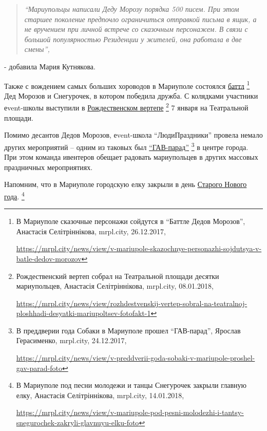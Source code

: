 \begin{quote}
\em\enquote{Мариупольцы написали Деду Морозу порядка 500 писем. При этом старшее поколение
предпочло ограничиться отправкой письма в ящик, а не вручением при личной
встрече со сказочным персонажем. В связи с большой популярностью Резиденции у
жителей, она работала в две смены}, 
\end{quote}
- добавила Мария Кутнякова.


Также с вождением самых больших хороводов в Мариуполе состоялся \href{https://mrpl.city/news/view/v-mariupole-skazochnye-personazhi-sojdutsya-v-batle-dedov-morozov}{баттл}%
\footnote{В Мариуполе сказочные персонажи сойдутся в \enquote{Баттле Дедов Морозов}, Анастасія Селітріннікова, mrpl.city, 26.12.2017, \par%
\url{https://mrpl.city/news/view/v-mariupole-skazochnye-personazhi-sojdutsya-v-batle-dedov-morozov}}
Дед Морозов и Снегурочек, в котором победила дружба. С колядками участники
еvent-школы выступили в \href{https://mrpl.city/news/view/rozhdestvenskij-vertep-sobral-na-teatralnoj-ploshhadi-desyatki-mariupoltsev-fotofakt-1}{Рождественском вертепе}%
\footnote{Рождественский вертеп собрал на Театральной площади десятки мариупольцев, Анастасія Селітріннікова, mrpl.city, 08.01.2018, \par%
\url{https://mrpl.city/news/view/rozhdestvenskij-vertep-sobral-na-teatralnoj-ploshhadi-desyatki-mariupoltsev-fotofakt-1}
}
7 января на Театральной площади.

Помимо десантов Дедов Морозов, еvent-школа \enquote{ЛюдиПраздники} провела немало
других мероприятий – одним из таковых был \href{https://mrpl.city/news/view/v-preddverii-goda-sobaki-v-mariupole-proshel-gav-parad-foto}{\enquote{ГАВ-парад}}%
\footnote{В преддверии года Собаки в Мариуполе прошел \enquote{ГАВ-парад}, Ярослав Герасименко, mrpl.city, 24.12.2017, \par%
\url{https://mrpl.city/news/view/v-preddverii-goda-sobaki-v-mariupole-proshel-gav-parad-foto}
}
в центре города. При этом команда ивентеров обещает радовать мариупольцев в
других массовых праздничных мероприятиях.

Напомним, что в Мариуполе городскую елку закрыли в день \href{https://mrpl.city/news/view/v-mariupole-pod-pesni-molodezhi-i-tantsy-snegurochek-zakryli-glavnuyu-elku-foto}{Старого Нового года}.%
\footnote{В Мариуполе под песни молодежи и танцы Снегурочек закрыли главную елку, Анастасія Селітріннікова, mrpl.city, 14.01.2018, \par%
\url{https://mrpl.city/news/view/v-mariupole-pod-pesni-molodezhi-i-tantsy-snegurochek-zakryli-glavnuyu-elku-foto}
}

